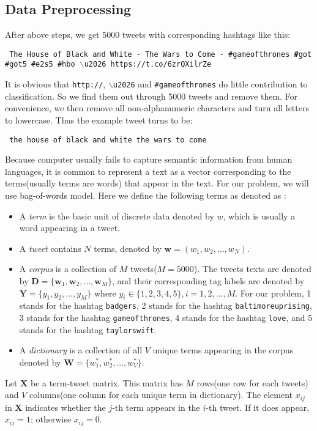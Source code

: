 \documentclass[letterpaper,11pt,twocolumn]{article}
\def\bfw{\mathbf w}
\def\bfW{\mathbf W}
\def\bfD{\mathbf D}
\def\bfY{\mathbf Y}
\def\bfX{\mathbf X}
\begin{document}
\subsection{Data Preprocessing}
After above steps, we get 5000 tweets with corresponding hashtags like this:
\begin{framed}
\texttt{
The House of Black and White - The Wars to Come - \#gameofthrones \textbf\#got \#got5 \#e2s5  \#hbo $\backslash$u2026 https://t.co/6zrQXilrZe
}
\end{framed}
It is obvious that \texttt{http://}, \texttt{$\backslash$u2026} and \texttt{\#gameofthrones} do little contribution to classification. So we find them out through 5000 tweets and remove them. For convenience, we then remove all non-alphanumeric characters and turn all letters to lowercase. Thus the example tweet turns to be:
\begin{framed}
\texttt{
the house of black and white the wars to come
}
\end{framed}
Because computer usually fails to capture semantic information from human languages, it is common to represent a text as a vector corresponding to the terms(usually terms are words) that appear in the text. For our problem, we will use bag-of-words model. Here we define the following terms as denoted as \cite{blei2003latent}:
\begin{itemize}
\item A \emph{term} is the basic unit of discrete data denoted by $w$, which is usually a word appearing in a tweet.
\item A \emph{tweet} contains $N$ terms, denoted by $\bfw = (w_1, w_2, \dots, w_N)$.
\item A \emph{corpus} is a collection of $M$ tweets($M=5000$). The tweets texts are denoted by $\bfD = \{\bfw_1, \bfw_2, \dots, \bfw_M\}$, and their corresponding tag labels are denoted by $\bfY = \{y_1, y_2, \dots, y_M\}$ where $y_i \in \{1, 2, 3, 4, 5\}, i = 1, 2, \dots, M$. For our problem, 1 stands for the hashtag \texttt{badgers}, 2 stands for the hashtag \texttt{baltimoreuprising}, 3 stands for the hashtag \texttt{gameofthrones}, 4 stands for the hashtag \texttt{love}, and 5 stands for the hashtag \texttt{taylorswift}.
\item A \emph{dictionary} is a collection of all $V$ unique terms appearing in the corpus denoted by $\bfW = \{w_1^*, w_2^*, \dots, w_V^*\}$.
\end{itemize}

Let $\bfX$ be a term-tweet matrix. This matrix has $M$ rows(one row for each tweets) and $V$ columns(one column for each unique term in dictionary). The element $x_{ij}$ in $\bfX$ indicates whether the $j$-th term appears in the $i$-th tweet. If it does appear, $x_{ij} = 1$; otherwise $x_{ij} = 0$.
\end{document}
